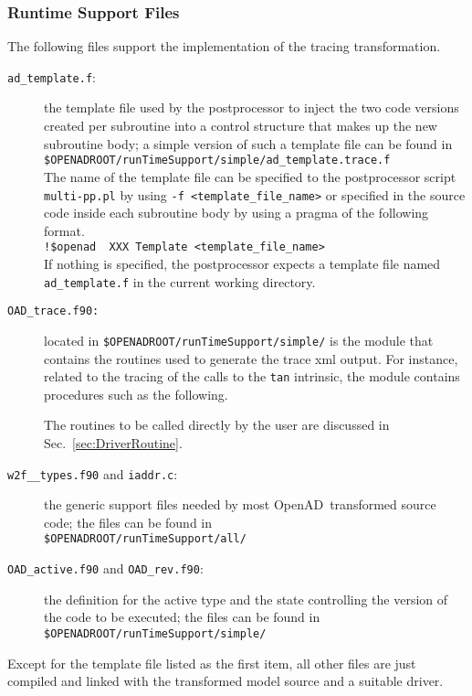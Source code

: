 \documentclass{article}
\newcommand{\openad}{OpenAD}
\newcommand{\refsec}[1]{{Sec.~\ref{#1}}}
\begin{document}
\subsubsection{Runtime Support Files}
The following files support the implementation of the tracing transformation.
\begin{description}
\item[{\tt ad\_template.f}:] the template file used by the postprocessor to inject the two code versions created per 
subroutine into a control structure that makes up the new subroutine body; a simple version of such a template file 
can be found in\\[1ex]   
\hspace*{.3cm}\lstinline{$OPENADROOT/runTimeSupport/simple/ad_template.trace.f} \\[1ex]%
The name of the template file can be specified to the postprocessor script \lstinline{multi-pp.pl} by using
\lstinline{-f <template_file_name>} or specified in the source code inside each subroutine body by using 
a pragma of the following format. \\[1ex]
\hspace*{.3cm}\lstinline{!$openad  XXX Template <template_file_name>} \\[1ex]%
If nothing is specified, the postprocessor expects a template file named \lstinline{ad_template.f} in the 
current working directory.  \\[1ex]
\item[{\tt OAD\_trace.f90:}] located in \lstinline{$OPENADROOT/runTimeSupport/simple/} %
is the module that contains 
the routines used to generate the trace xml output. For instance, related to the tracing of 
the calls to the \lstinline{tan} intrinsic, the module contains procedures such as the following.

The routines to be called directly by the user are discussed in \refsec{sec:DriverRoutine}.
\item[{\tt w2f\_\_types.f90} and {\tt iaddr.c}:] the generic support files needed by most 
\openad\ transformed source code;
the files can be found in \\[1ex]
\hspace*{.3cm}\lstinline{$OPENADROOT/runTimeSupport/all/}%
\item[{\tt OAD\_active.f90} and {\tt OAD\_rev.f90}:] the definition for the active type and the state 
controlling the version of the code to be executed;
the files can be found in \\[1ex]
\hspace*{.3cm}\lstinline{$OPENADROOT/runTimeSupport/simple/}%
\end{description}
Except for the template file listed as the first item, all other files are just compiled and linked 
with the transformed model source and a suitable driver.
\end{document}
